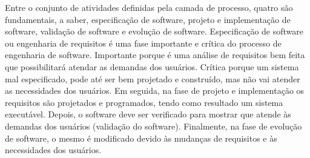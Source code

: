 Entre o conjunto de atividades definidas pela camada de processo, quatro são
fundamentais, a saber, especificação de software, projeto e implementação de
software, validação de software e evolução de software. Especificação de software
ou engenharia de requisitos é uma fase importante e crítica do processo de engenharia
de software. Importante porque é uma análise de requisitos bem feita que possibilitará
atendar as demandas dos usuários. Crítica porque um sistema mal especificado, pode até ser
bem projetado e construído, mas não vai atender as necessidades dos usuários.
Em seguida, na fase de projeto e implementação os requisitos são projetados e programados,
tendo como resultado um sistema executável. Depois, o software deve ser verificado
para mostrar que atende às demandas dos usuários (validação do software). Finalmente,
na fase de evolução de software, o mesmo é modificado devido às mudanças
de requisitos e às necessidades dos usuários.
